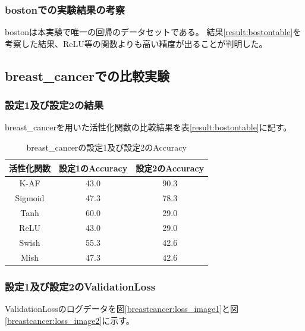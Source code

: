 \subsubsection{bostonでの実験結果の考察}
bostonは本実験で唯一の回帰のデータセットである。
結果\ref{result:bostontable}を考察した結果、ReLU等の関数よりも高い精度が出ることが判明した。





\subsection{breast\_cancerでの比較実験}
\label{ev:breastcancer}

\subsubsection{設定1及び設定2の結果}

breast\_cancerを用いた活性化関数の比較結果を表\ref{result:bostontable}に記す。


\begin{table}[htbp]
    \begin{center}
        \caption{breast\_cancerの設定1及び設定2のAccuracy}
        \label{result:breastcancer}
        \vspace{2mm} 
        \begin{tabular}{|c|c|c|}
            \hline
            活性化関数              & 設定1のAccuracy &  設定2のAccuracy \\
            \hline
            K-AF            & 43.0 & 90.3 \\
            \hline
            Sigmoid            & 47.3 & 78.3\\
            \hline
            Tanh            & 60.0 & 29.0\\
            \hline
            ReLU        & 43.0 & 29.0\\
            \hline
            Swish           & 55.3 & 42.6\\
            \hline
            Mish           & 47.3 & 42.6\\
            \hline
        \end{tabular}
    \end{center}
\end{table}




\subsubsection{設定1及び設定2のValidationLoss}
\label{breastcancer:loss}
ValidationLossのログデータを図\ref{breastcancer:loss_image1}と図\ref{breastcancer:loss_image2}に示す。


